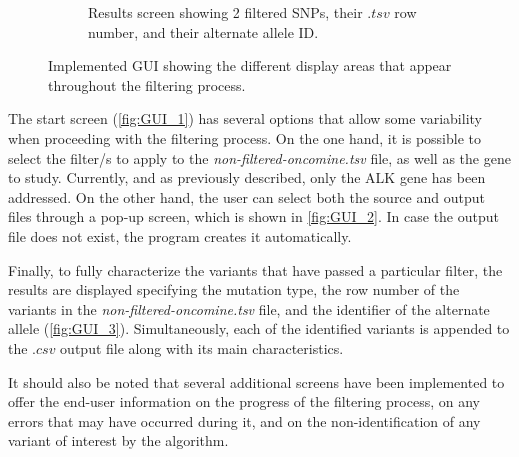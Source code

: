 \begin{figure}[ht]
\begin{subfigure}{0.52\textwidth}
        \caption{Results screen showing 2 filtered SNPs, their $.tsv$ row number, and their alternate allele ID.}
        \label{fig:GUI_3}
    \end{subfigure}
    \hfill
    \caption{Implemented GUI showing the different display areas that appear throughout the filtering process.}
    \label{fig:GUI}
\end{figure}

The start screen (\autoref{fig:GUI_1}) has several options that allow some variability when proceeding with the filtering process. On the one hand, it is possible to select the filter\slash s to apply to the \textit{non-filtered-oncomine.tsv} file, as well as the gene to study. Currently, and as previously described, only the ALK gene has been addressed. On the other hand, the user can select both the source and output files through a pop-up screen, which is shown in \autoref{fig:GUI_2}. In case the output file does not exist, the program creates it automatically.

Finally, to fully characterize the variants that have passed a particular filter, the results are displayed specifying the mutation type, the row number of the variants in the \textit{non-filtered-oncomine.tsv} file, and the identifier of the alternate allele (\autoref{fig:GUI_3}). Simultaneously, each of the identified variants is appended to the $.csv$ output file along with its main characteristics.

It should also be noted that several additional screens have been implemented to offer the end-user information on the progress of the filtering process, on any errors that may have occurred during it, and on the non-identification of any variant of interest by the algorithm.
